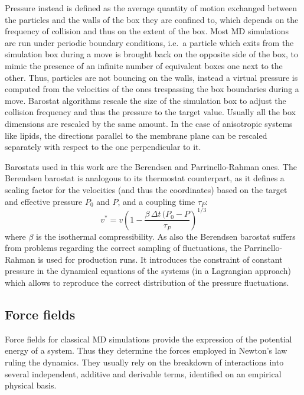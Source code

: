 Pressure instead is defined as the average quantity of motion exchanged between the particles and the walls of the box they are confined to, which depends on the frequency of collision and thus on the extent of the box. Most MD simulations are run under periodic boundary conditions, i.e.\ a particle which exits from the simulation box during a move is brought back on the opposite side of the box, to mimic the presence of an infinite number of equivalent boxes one next to the other. Thus, particles are not bouncing on the walls, instead a virtual pressure is computed from the velocities of the ones trespassing the box boundaries during a move.
Barostat algorithms rescale the size of the simulation box to adjust the collision frequency and thus the pressure to the target value. Usually all the box dimensions are rescaled by the same amount. In the case of anisotropic systems like lipids, the directions parallel to the membrane plane can be rescaled separately with respect to the one perpendicular to it.

Barostats used in this work are the Berendsen \citep{Berendsen1984} and Parrinello-Rahman \citep{Parrinello1981} ones. The Berendsen barostat is analogous to its thermostat counterpart, as it defines a scaling factor for the velocities (and thus the coordinates) based on the target and effective pressure $P_0$ and $P$, and a coupling time $\tau_P$:
\begin{equation}
    v^* = v \left( 1 - \frac{\beta \, \Delta t \, (P_0 - P}{\tau_P} \right)^{1/3}
\end{equation}
where $\beta$ is the isothermal compressibility. As also the Berendsen barostat suffers from problems regarding the correct sampling of fluctuations, the Parrinello-Rahman is used for production runs. It introduces the constraint of constant pressure in the dynamical equations of the systems (in a Lagrangian approach) which allows to reproduce the correct distribution of the pressure fluctuations.

\subsection{Force fields}

Force fields for classical MD simulations provide the expression of the potential energy of a system. Thus they determine the forces employed in Newton's law ruling the dynamics.
%
They usually rely on the breakdown of interactions into several independent, additive and derivable terms, identified on an empirical physical basis.

